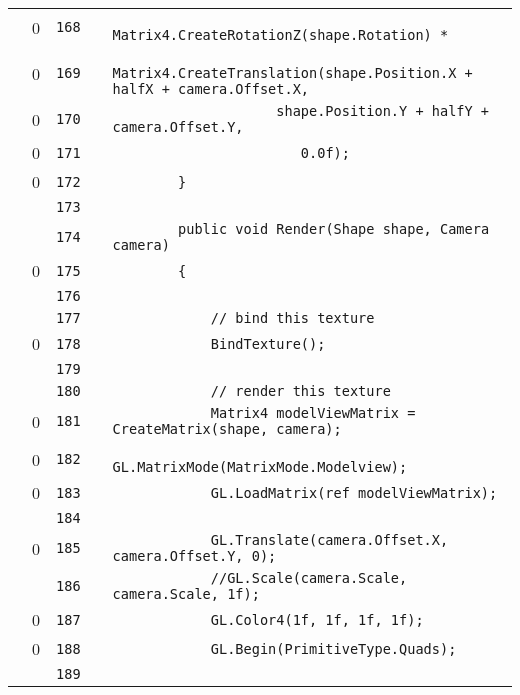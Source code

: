 \documentclass[a4paper,landscape,10pt]{article}
\begin{document}
\begin{longtable}[l]{lrrll}
\cellcolor{red} & 0 & \verb~168~ & & \verb~                   Matrix4.CreateRotationZ(shape.Rotation) *~\\
\cellcolor{red} & 0 & \verb~169~ & & \verb~                   Matrix4.CreateTranslation(shape.Position.X + halfX + camera.Offset.X,~\\
\cellcolor{red} & 0 & \verb~170~ & & \verb~                    shape.Position.Y + halfY + camera.Offset.Y,~\\
\cellcolor{red} & 0 & \verb~171~ & & \verb~                       0.0f);~\\
\cellcolor{red} & 0 & \verb~172~ & & \verb~        }~\\
\cellcolor{gray} &  & \verb~173~ & & \verb~~\\
\cellcolor{gray} &  & \verb~174~ & & \verb~        public void Render(Shape shape, Camera camera)~\\
\cellcolor{red} & 0 & \verb~175~ & & \verb~        {~\\
\cellcolor{gray} &  & \verb~176~ & & \verb~~\\
\cellcolor{gray} &  & \verb~177~ & & \verb~            // bind this texture~\\
\cellcolor{red} & 0 & \verb~178~ & & \verb~            BindTexture();~\\
\cellcolor{gray} &  & \verb~179~ & & \verb~~\\
\cellcolor{gray} &  & \verb~180~ & & \verb~            // render this texture~\\
\cellcolor{red} & 0 & \verb~181~ & & \verb~            Matrix4 modelViewMatrix = CreateMatrix(shape, camera);~\\
\cellcolor{red} & 0 & \verb~182~ & & \verb~            GL.MatrixMode(MatrixMode.Modelview);~\\
\cellcolor{red} & 0 & \verb~183~ & & \verb~            GL.LoadMatrix(ref modelViewMatrix);~\\
\cellcolor{gray} &  & \verb~184~ & & \verb~~\\
\cellcolor{red} & 0 & \verb~185~ & & \verb~            GL.Translate(camera.Offset.X, camera.Offset.Y, 0);~\\
\cellcolor{gray} &  & \verb~186~ & & \verb~            //GL.Scale(camera.Scale, camera.Scale, 1f);~\\
\cellcolor{red} & 0 & \verb~187~ & & \verb~            GL.Color4(1f, 1f, 1f, 1f);~\\
\cellcolor{red} & 0 & \verb~188~ & & \verb~            GL.Begin(PrimitiveType.Quads);~\\
\cellcolor{gray} &  & \verb~189~ & & \verb~~\\

\end{longtable}
\end{document}
